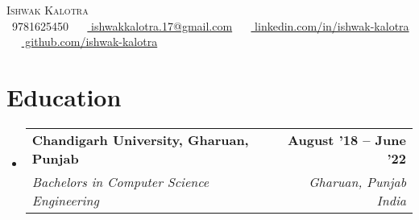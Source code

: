 \documentclass[letterpaper,11pt]{article}
\makeatletter
\newcommand{\resumeItem}[1]{
  \item\small{
    {#1 \vspace{-2pt}}
  }
}
\newcommand{\resumeSubheading}[4]{
  \vspace{-2pt}\item
    \begin{tabular*}{1.0\textwidth}[t]{l@{\extracolsep{\fill}}r}
      \textbf{#1} & \textbf{\small #2} \\
      \textit{\small#3} & \textit{\small #4} \\
    \end{tabular*}\vspace{-7pt}
}
\newcommand{\resumeSubHeadingListStart}{\begin{itemize}[leftmargin=0.0in, label={}]}
\newcommand{\resumeSubHeadingListEnd}{\end{itemize}}
\newcommand{\resumeItemListStart}{\justify \begin{itemize}}
\newcommand{\resumeItemListEnd}{\end{itemize}\vspace{-2pt}}
\makeatother
\begin{document}

\begin{center}
    {\Huge \scshape Ishwak Kalotra} \\ \vspace{1pt}
    \vspace{5pt}
    \small \raisebox{-0.1\height}\faPhone\ 9781625450 ~ 
    \raisebox{-0.2\height}\faEnvelope\ \href{mailto:ishwakkalotra.17@gmail.com}{ ishwakkalotra.17@gmail.com} ~ 
    \raisebox{-0.2\height}\faLinkedin\ \href{https://www.linkedin.com/in/ishwak- kalotra-263604195/}{ linkedin.com/in/ishwak-kalotra}  ~
    \raisebox{-0.2\height}\faGithub\ \href{https://github.com/0Verlord-41}{ github.com/ishwak-kalotra}
    \vspace{-8pt}
\end{center}


\section{Education}
  \resumeSubHeadingListStart
    \resumeSubheading
      {Chandigarh University, Gharuan, Punjab}{August '18 -- June '22}
      {Bachelors in Computer Science Engineering}{Gharuan, Punjab India}
  \resumeSubHeadingListEnd


    

\end{document}
